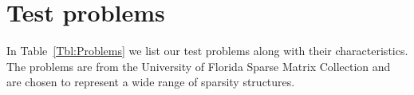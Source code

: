 \documentclass{article}
\begin{document}
\clearpage


\appendix

\section{Test problems}\label{appendix}
\setcounter{equation}{0}
\setcounter{table}{0}
\setcounter{figure}{0}
\setcounter{table}{0}
\renewcommand{\thetable}{A.\arabic{table}}


In Table~\ref{Tbl:Problems} we list  our test problems along with 
their characteristics. The problems are from the 
University of Florida Sparse Matrix Collection  and are chosen 
to represent a wide range of sparsity structures.
\end{document}

